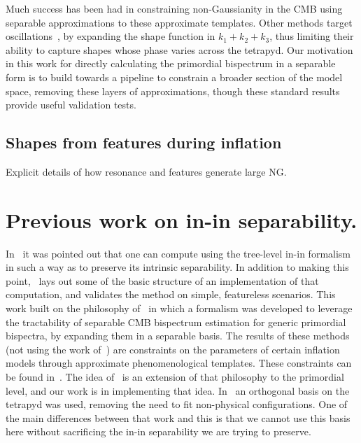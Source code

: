 Much success has been had in constraining non-Gaussianity
in the CMB using separable approximations to these approximate templates.
Other methods target oscillations~\cite{reso_estimator}, by expanding the shape function
in $k_1+k_2+k_3$, thus limiting their ability to capture shapes whose
phase varies across the tetrapyd.
Our motivation in this work for directly calculating the primordial
bispectrum in a separable form is to build towards
a pipeline to constrain a broader section of the model space,
removing these layers of approximations,
though these standard results provide useful validation tests.
    \subsection{Shapes from features during inflation}
    Explicit details of how resonance and features generate large NG.
\section{Previous work on in-in separability.}
    In~\cite{Funakoshi} it was pointed out that one can compute using the
tree-level in-in formalism in such a way as to preserve its intrinsic
separability. In addition to making this point,~\cite{Funakoshi} lays
out some of the basic structure of an implementation of that computation,
and validates the method on simple, featureless scenarios.
This work built on the philosophy of~\cite{FergShell_1,FergShell_2,FergShell_3}
in which a formalism was developed to
leverage the tractability of separable CMB bispectrum estimation
for generic primordial bispectra, by expanding them in a separable basis.
The results of these methods (not using the work of~\cite{Funakoshi})
are constraints on the parameters of certain inflation models through approximate
phenomenological templates.
These constraints can be found in~\cite{Planck_NG_2015, Planck_NG_2018}.
The idea of~\cite{Funakoshi} is an extension of that philosophy to the primordial level,
and our work is in implementing that idea.
In~\cite{FergShell_1,FergShell_2,FergShell_3} an orthogonal basis on the tetrapyd was used,
removing the need to fit non-physical configurations.
One of the main differences between that work and this
is that we cannot use this basis here without sacrificing the
in-in separability we are trying to preserve.


